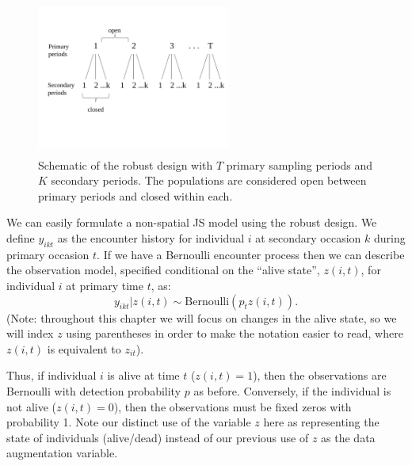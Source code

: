 \begin{figure}[h]
\centering
\includegraphics[height=2in,width=2.5in]{Ch16-Open/figs/RobustDesign.pdf}
\caption{Schematic of the robust design with $T$ primary sampling periods and $K$ secondary periods. The populations
are considered open between primary periods and closed within each.}
\label{open.figs.robustdesign}
\end{figure}

We can easily formulate
 a non-spatial JS
model using the robust design. We 
define $y_{ikt}$ as the encounter history for individual
$i$ at secondary occasion $k$ during primary occasion $t$.  If we have
a Bernoulli encounter process then we can describe the observation
model, specified conditional on the ``alive state'', $z(i,t)$, for
individual $i$ at primary time $t$, as:
 \[
  y_{ikt}|z(i,t) \sim
\mbox{Bernoulli}(p_t z(i,t)).
\]
(Note: throughout this chapter we will focus on changes in the 
alive state, so we will index $z$ using parentheses in order to make the notation easier to read,
where $z(i,t)$ is equivalent to $z_{it}$).

Thus, if individual $i$ is alive at time $t$ ($z(i,t)=1$), then the
observations are Bernoulli with detection probability $p$ as before.  Conversely, if the individual is
not alive ($z(i,t)=0$), then the observations must be fixed zeros with
probability 1. Note our distinct use of the variable $z$ here as
representing the state of individuals (alive/dead) instead of our
previous use of $z$ as the data augmentation variable. 

